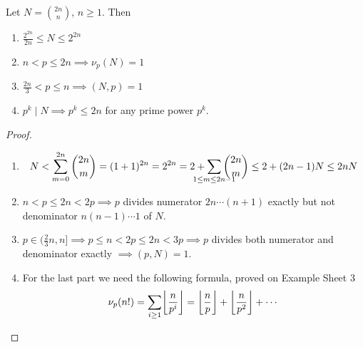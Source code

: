 \documentclass{article}
\DeclarePairedDelimiter\floor{\lfloor}{\rfloor}
\begin{document}
\begin{nlemma}\label{lem:5.7}
    Let $N = \binom{2n}{n}$, $n \geq 1$. Then
    \begin{enumerate}[label=(\roman*)]
        \item $\frac{2^{2n}}{2n} \leq N \leq 2^{2n}$
        \item $n < p \leq 2n \implies \nu_p(N) = 1$
        \item $\frac{2n}{3} < p \leq n \implies (N, p) = 1$
        \item $p^k \mid N \implies p^k \leq 2n$ for any prime power $p^k$.
    \end{enumerate}
\end{nlemma}

\begin{proof}
    \leavevmode
    \begin{enumerate}[label=(\roman*)]
        \item
            \begin{equation*}
                N < \sum_{m=0}^{2n} \binom{2n}{m} = (1+1)^{2n} = 2^{2n} = 2 + \sum_{\mathclap{1 \leq m \leq 2n-1}} \binom{2n}{m} \leq 2 + (2n-1) N \leq 2n N
            \end{equation*}
        \item $n < p \leq 2n < 2p \implies p$ divides numerator $2n \dotsm (n+1)$ exactly but not denominator $n (n-1) \dotsm 1$ of $N$.
        \item $p \in (\frac{2}{3}n, n] \implies p \leq n < 2p \leq 2n < 3p \implies p$ divides both numerator and denominator exactly $\implies (p, N) = 1$.
        \item For the last part we need the following formula, proved on Example Sheet 3
            \begin{equation*}
                \nu_p(n!) = \sum_{i \geq 1} \floor*{\frac{n}{p^i}} = \floor*{\frac{n}{p}} + \floor*{\frac{n}{p^2}} + \dotsb
            \end{equation*}


\end{enumerate}
\end{proof}
\end{document}
